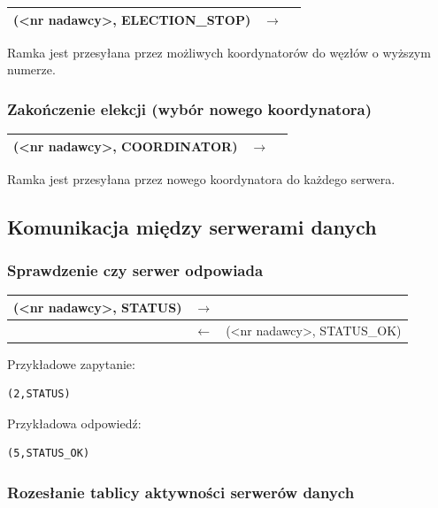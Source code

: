 \begin{longtable}{| p{} | p{}| p{} |} 
\hline
(<nr nadawcy>, ELECTION\_STOP) & $\rightarrow$ &  \\ \hline
\end{longtable}

Ramka jest przesyłana przez możliwych koordynatorów do węzłów o wyższym numerze.

\subsubsection{Zakończenie elekcji (wybór nowego koordynatora)}

\begin{longtable}{| p{} | p{}| p{} |} 
\hline
(<nr nadawcy>, COORDINATOR) & $\rightarrow$ &  \\ \hline
\end{longtable}

Ramka jest przesyłana przez nowego koordynatora do każdego serwera.

\subsection{Komunikacja między serwerami danych}

\subsubsection{Sprawdzenie czy serwer odpowiada}

\begin{longtable}{| p{} | p{}| p{} |} 
\hline
(<nr nadawcy>, STATUS) & $\rightarrow$ &  \\ \hline
 & $\leftarrow$ & (<nr nadawcy>, STATUS\_OK) \\ \hline
\end{longtable}

Przykładowe zapytanie:
\begin{lstlisting}[style=incode]
(2,STATUS)
\end{lstlisting}
Przykładowa odpowiedź:
\begin{lstlisting}[style=incode]
(5,STATUS_OK)
\end{lstlisting}

\subsubsection{Rozesłanie tablicy aktywności serwerów danych}

